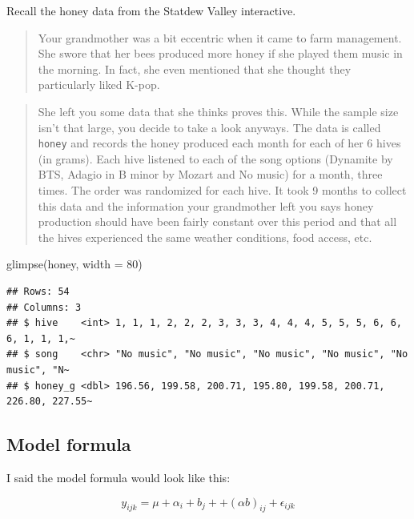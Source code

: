 \documentclass[
  openany]{book}
\newenvironment{Shaded}{\begin{snugshade}}{\end{snugshade}}
\newcommand{\AttributeTok}[1]{\textcolor[rgb]{0.77,0.63,0.00}{#1}}
\newcommand{\DecValTok}[1]{\textcolor[rgb]{0.00,0.00,0.81}{#1}}
\newcommand{\FunctionTok}[1]{\textcolor[rgb]{0.00,0.00,0.00}{#1}}
\newcommand{\NormalTok}[1]{#1}
\begin{document}
Recall the honey data from the Statdew Valley interactive.

\begin{quote}
Your grandmother was a bit eccentric when it came to farm management. She swore that her bees produced more honey if she played them music in the morning. In fact, she even mentioned that she thought they particularly liked K-pop.
\end{quote}

\begin{quote}
She left you some data that she thinks proves this. While the sample size isn't that large, you decide to take a look anyways. The data is called \texttt{honey} and records the honey produced each month for each of her 6 hives (in grams). Each hive listened to each of the song options (Dynamite by BTS, Adagio in B minor by Mozart and No music) for a month, three times. The order was randomized for each hive. It took 9 months to collect this data and the information your grandmother left you says honey production should have been fairly constant over this period and that all the hives experienced the same weather conditions, food access, etc.
\end{quote}

\begin{Shaded}
\begin{Highlighting}[]
\FunctionTok{glimpse}\NormalTok{(honey, }\AttributeTok{width =} \DecValTok{80}\NormalTok{) }
\end{Highlighting}
\end{Shaded}

\begin{verbatim}
## Rows: 54
## Columns: 3
## $ hive    <int> 1, 1, 1, 2, 2, 2, 3, 3, 3, 4, 4, 4, 5, 5, 5, 6, 6, 6, 1, 1, 1,~
## $ song    <chr> "No music", "No music", "No music", "No music", "No music", "N~
## $ honey_g <dbl> 196.56, 199.58, 200.71, 195.80, 199.58, 200.71, 226.80, 227.55~
\end{verbatim}

\hypertarget{model-formula-2}{%
\subsection{Model formula}\label{model-formula-2}}

I said the model formula would look like this:

\[y_{ijk} = \mu + \alpha_i + b_{j} + + (\alpha b)_{ij} + \epsilon_{ijk}\]
\end{document}
